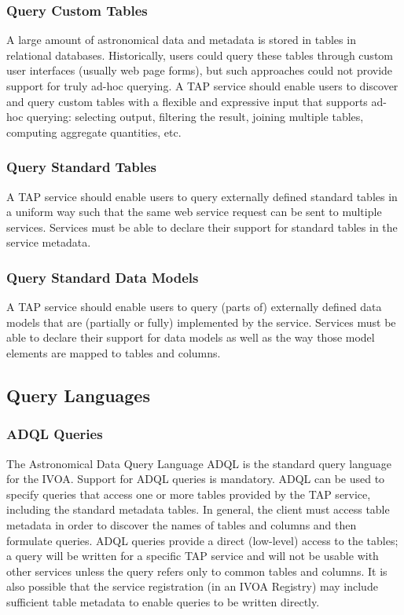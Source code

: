 \documentclass[11pt,letter]{ivoa}
\begin{document}
\subsubsection{Query Custom Tables}
A large amount of astronomical data and metadata is stored in tables in 
relational databases. Historically, users could query these tables through 
custom user interfaces (usually web page forms), but such approaches could not 
provide support for truly ad-hoc querying. A TAP service should enable users to 
discover and query custom tables with a flexible and expressive input that 
supports ad-hoc querying: selecting output, filtering the result, joining 
multiple tables, computing aggregate quantities, etc. 

\subsubsection{Query Standard Tables}
A TAP service should enable users to query externally defined standard tables 
in a uniform way such that the same web service request can be sent to multiple 
services. Services must be able to declare their support for standard tables in 
the service metadata.

\subsubsection{Query Standard Data Models}
A TAP service should enable users to query (parts of) externally defined data 
models that are (partially or fully) implemented by the service. Services must 
be able to declare their support for data models as well as the way those model 
elements are mapped to tables and columns.

\subsection{Query Languages}

\subsubsection{ADQL Queries}
The Astronomical Data Query Language ADQL \citep{2008ivoa.spec.1030O} is the standard 
query language for the IVOA. Support for ADQL queries is mandatory. ADQL can be 
used to specify queries  that access one or more tables provided by the TAP 
service, including the standard metadata tables. In general, the client must 
access table metadata in order to discover the names of tables and columns and 
then formulate queries. ADQL queries provide a direct (low-level) access to the 
tables; a query will be written for a specific TAP service and will not be 
usable with other services unless the query refers only to common tables and 
columns. It is also possible that the service registration (in an IVOA Registry) 
may include sufficient table metadata to enable queries to be written directly.
\end{document}
